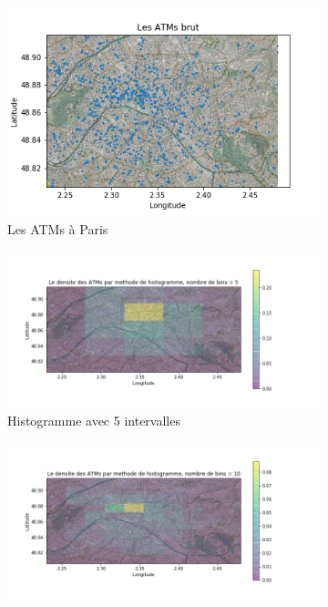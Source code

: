 \documentclass[a4paper,12pt]{article}
\begin{document}
\begin{figure}[h!]
\caption{Densite par méthode des histogrammes}
\label{fig:tme2_histos}
\begin{subfigure}{.5\textwidth}
	\centering
	\label{fig:atms_brut}
	\includegraphics[width=0.8\linewidth]{images/tme2/atms_brut.png}
	\caption{Les ATMs à Paris}
\end{subfigure}%
\begin{subfigure}{.5\textwidth}
  \centering
	\label{fig:atms_histo_5}
	\includegraphics[width=0.8\linewidth]{images/tme2/atms_histo_5.png}
	\caption{Histogramme avec 5 intervalles}
\end{subfigure}
\begin{subfigure}{.5\textwidth}
  \centering
	\label{fig:atms_histo_10}
	\includegraphics[width=0.8\linewidth]{images/tme2/atms_histo_10.png}

\end{subfigure}
\end{figure}
\end{document}
